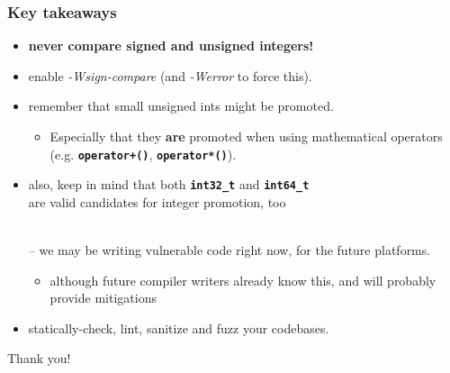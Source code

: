 \documentclass[aspectratio=169]{beamer}
\newcommand{\greenemph}[1]{\textit{\textcolor{clGreen}{#1}}}
\newcommand{\cpp}[1]{\texttt{\textbf{\textcolor{clCodeBlue}{#1}}}}
\begin{document}
\begin{frame}
\frametitle{Key takeaways}
{\centering
\begin{itemize}
  \item{} \textbf{\textcolor{clRedFlag}{never} compare signed and unsigned integers!}
  \item{} enable \greenemph{-Wsign-compare} (and \greenemph{-Werror} to force this).
  \item{} remember that small unsigned ints might be promoted.
  \begin{itemize}
    \item{} Especially that they \textbf{are} promoted when using mathematical operators\\
    (e.g. \cpp{operator+()}, \cpp{operator*()}).
  \end{itemize}
  \item{} also, keep in mind that both \cpp{int32\_t} and \cpp{int64\_t}\\
  are valid candidates for integer promotion, too\\
  \vspace*{-3pt}
  \raggedleft{\tiny \textcolor{clGray}{on platforms where int is of size 64-bits and 128-bits, respectively}}\\
  \raggedright-- we may be writing vulnerable code right now, for the future platforms.
  \begin{itemize}
    \item{} {\tiny although future compiler writers already know this, and will probably provide mitigations}
  \end{itemize}
  \item{} statically-check, lint, sanitize and fuzz your codebases.
\end{itemize}

\vspace{2ex}
\begin{center}{\Large Thank you!}\end{center}
}
\end{frame}
\end{document}

